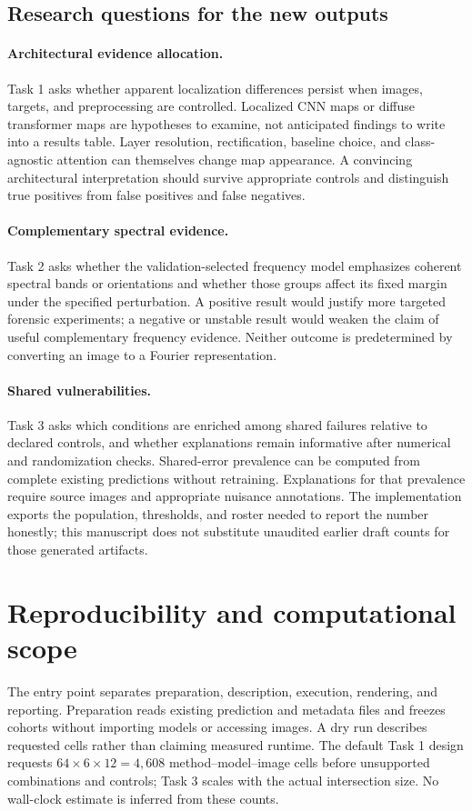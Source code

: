 \documentclass{article}
\begin{document}
\subsection{Research questions for the new outputs}
\paragraph{Architectural evidence allocation.}
Task 1 asks whether apparent localization differences persist when images, targets, and preprocessing are controlled. Localized CNN maps or diffuse transformer maps are hypotheses to examine, not anticipated findings to write into a results table. Layer resolution, rectification, baseline choice, and class-agnostic attention can themselves change map appearance. A convincing architectural interpretation should survive appropriate controls and distinguish true positives from false positives and false negatives.

\paragraph{Complementary spectral evidence.}
Task 2 asks whether the validation-selected frequency model emphasizes coherent spectral bands or orientations and whether those groups affect its fixed margin under the specified perturbation. A positive result would justify more targeted forensic experiments; a negative or unstable result would weaken the claim of useful complementary frequency evidence. Neither outcome is predetermined by converting an image to a Fourier representation.

\paragraph{Shared vulnerabilities.}
Task 3 asks which conditions are enriched among shared failures relative to declared controls, and whether explanations remain informative after numerical and randomization checks. Shared-error prevalence can be computed from complete existing predictions without retraining. Explanations for that prevalence require source images and appropriate nuisance annotations. The implementation exports the population, thresholds, and roster needed to report the number honestly; this manuscript does not substitute unaudited earlier draft counts for those generated artifacts.

\section{Reproducibility and computational scope}
The entry point separates preparation, description, execution, rendering, and reporting. Preparation reads existing prediction and metadata files and freezes cohorts without importing models or accessing images. A dry run describes requested cells rather than claiming measured runtime. The default Task 1 design requests $64\times6\times12=4{,}608$ method--model--image cells before unsupported combinations and controls; Task 3 scales with the actual intersection size. No wall-clock estimate is inferred from these counts.
\end{document}
